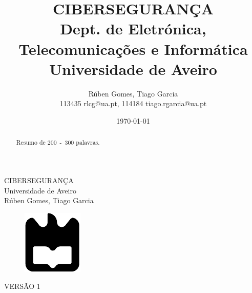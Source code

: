 \documentclass{report}
\begin{document}
%
\def\titulo{CIBERSEGURANÇA}
\def\data{DATA}
\def\autores{Rúben Gomes, Tiago Garcia}
\def\autorescontactos{113435 rlcg@ua.pt, 114184 tiago.rgarcia@ua.pt}
\def\versao{VERSÃO 1}
\def\departamento{Dept. de Eletrónica, Telecomunicações e Informática}
\def\empresa{Universidade de Aveiro}
\def\logotipo{ua.pdf}

%
%
\begin{titlepage}

\begin{center}
%
\vspace*{50mm}
%
{\Huge \titulo}\\ 
%
\vspace{10mm}
%
{\Large \empresa}\\
%
\vspace{10mm}
%
{\LARGE \autores}\\ 
%
\vspace{30mm}
%
\begin{figure}[h]
    \center
    \includegraphics{ua}
\end{figure}
%
\vspace{30mm}
\end{center}
%
\begin{flushright}
\versao
\end{flushright}
\end{titlepage}

\title{%
{\Huge\textbf{\titulo}}\\
{\Large \departamento\\ \empresa}
}
%
\author{%
    \autores \\
    \autorescontactos
}
%
\date{\today}
%
\maketitle


\begin{abstract}
Resumo de 200~-~300 palavras.
\end{abstract}

\end{document}
